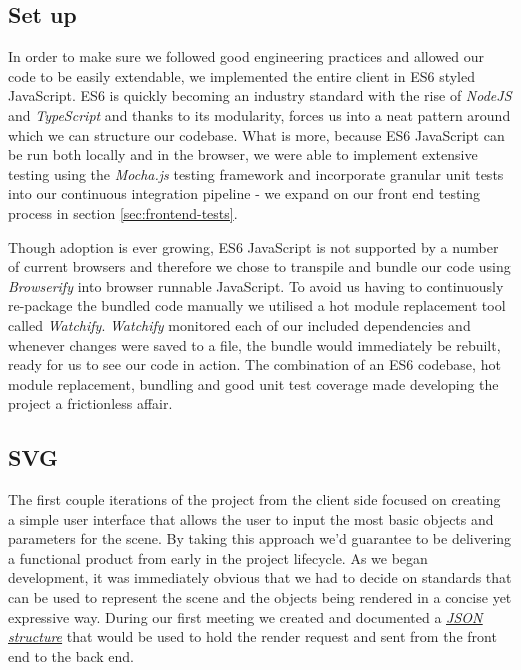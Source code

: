 \documentclass[a4paper]{report}
\begin{document}
	\subsection{Set up}
	In order to make sure we followed good engineering practices and allowed our code to be easily extendable, we implemented the entire client in ES6 styled JavaScript. ES6 is quickly becoming an industry standard with the rise of \textit{NodeJS} and \textit{TypeScript} and thanks to its modularity, forces us into a neat pattern around which we can structure our codebase. What is more, because ES6 JavaScript can be run both locally and in the browser, we were able to implement extensive testing using the \textit{Mocha.js} testing framework and incorporate granular unit tests into our continuous integration pipeline - we expand on our front end testing process in section \ref{sec:frontend-tests}.\newline
	\par Though adoption is ever growing, ES6 JavaScript is not supported by a number of current browsers and therefore we chose to transpile and bundle our code using \textit{Browserify} into browser runnable JavaScript. To avoid us having to continuously re-package the bundled code manually we utilised a hot module replacement tool called \textit{Watchify}. \textit{Watchify} monitored each of our included dependencies and whenever changes were saved to a file, the bundle would immediately be rebuilt, ready for us to see our code in action. The combination of an ES6 codebase, hot module replacement, bundling and good unit test coverage made developing the project a frictionless affair.
	
	\subsection{SVG} \label{sec:svg}
	
	The first couple iterations of the project from the client side focused on creating a simple user interface that allows the user to input the most basic objects and parameters for the scene. By taking this approach we'd guarantee to be delivering a functional product from early in the project lifecycle. As we began development, it was immediately obvious that we had to decide on standards that can be used to represent the scene and the objects being rendered in a concise yet expressive way. During our first meeting we created and documented a  \href{https://github.com/davidbenicek/raytracer/wiki/Initial-JSON-payload-design}{\underline{\textit{JSON structure}}} that would be used to hold the render request and sent from the front end to the back end.\newline
	
\end{document}
